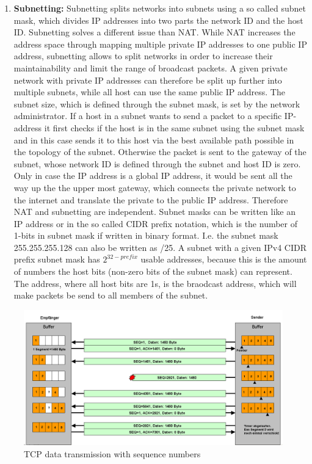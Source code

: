 \begin{enumerate}
      \item \textbf{Subnetting:} Subnetting splits networks into subnets using a so called subnet mask, which divides IP addresses into two parts \textendash{} the network ID and the host ID. Subnetting solves a different issue than \ac{NAT}. While \ac{NAT} increases the address space through mapping multiple private IP addresses to one public IP address, subnetting allows to split networks in order to increase their maintainability and limit the range of broadcast packets. A given private network with private IP addresses can therefore be split up further into multiple subnets, while all host can use the same public IP address. The subnet size, which is defined through the subnet mask, is set by the network administrator. If a host in a subnet wants to send a packet to a specific IP-address it first checks if the host is in the same subnet using the subnet mask and in this case sends it to this host via the best available path possible in the topology of the subnet. Otherwise the packet is sent to the gateway of the subnet, whose network ID is defined through the subnet and host ID is zero. Only in case the IP address is a global IP address, it would be sent all the way up the the upper most gateway, which connects the private network to the internet and translate the private to the public IP address. Therefore \ac{NAT} and subnetting are independent. Subnet masks can be written like an IP address or in the so called CIDR prefix notation, which is the number of 1-bits in subnet mask if written in binary format. I.e. the subnet mask 255.255.255.128 can also be written as /25. A subnet with a given IPv4 CIDR prefix subnet mask has $2^{32 - prefix}$ usable addresses, because this is the amount of numbers the host bits (non-zero bits of the subnet mask) can represent. The address, where all host bits are 1s, is the braodcast address, which will make packets be send to all members of the subnet.
\end{enumerate}

\begin{figure}[h]
      \centering
      \includegraphics[width=\textwidth]{gfx/Tcp_transfer.png}
      \caption{TCP data transmission with sequence numbers}
      \label{fig:tcp_data_transmission}
\end{figure}